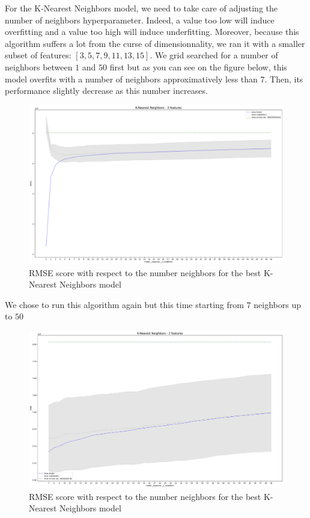 For the K-Nearest Neighbors model, we need to take care of adjusting the number of neighbors hyperparameter. Indeed, a value too low will induce overfitting and a value too high will induce underfitting. Moreover, because this algorithm suffers a lot from the curse of dimensionnality, we ran it with a smaller subset of features: $[3,5,7,9,11,13,15]$. We grid searched for a number of neighbors between $1$ and $50$ first but as you can see on the figure below, this model overfits with a number of neighbors approximatively less than $7$. Then, its performance slightly decrease as this number increases.

\begin{figure}[H]
	\centering
	\includegraphics{figures/knn_eval.pdf}
	\caption{RMSE score with respect to the number neighbors for the best K-Nearest Neighbors model}
	\label{fig:knn_eval1}
\end{figure}

We chose to run this algorithm again but this time starting from $7$ neighbors up to $50$

\begin{figure}[H]
	\centering
	\includegraphics{figures/knn_eval2.pdf}
	\caption{RMSE score with respect to the number neighbors for the best K-Nearest Neighbors model}
	\label{fig:knn_eval2}
\end{figure}

